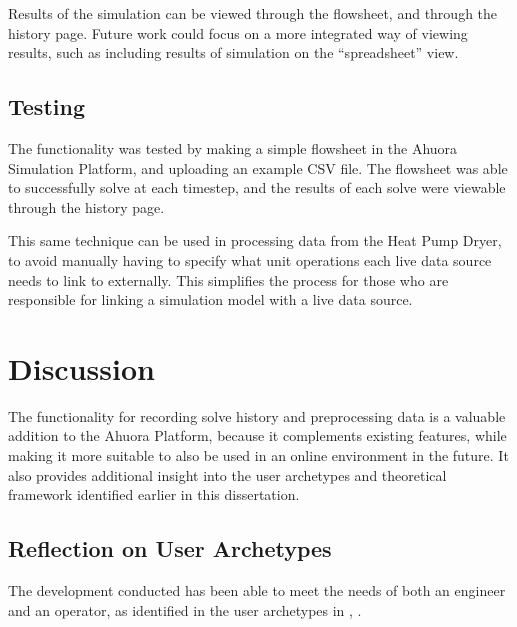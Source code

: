 Results of the simulation can be viewed through the flowsheet, and through the history page. Future work could focus on a more integrated way of viewing results, such as including results of simulation on the ``spreadsheet'' view.

\subsection{Testing}

The functionality was tested by making a simple flowsheet in the Ahuora Simulation Platform, and uploading an example CSV file. The flowsheet was able to successfully solve at each timestep, and the results of each solve were viewable through the history page. 

This same technique can be used in processing data from the Heat Pump Dryer, to avoid manually having to specify what unit operations each live data source needs to link to externally. This simplifies the process for those who are responsible for linking a simulation model with a live data source.



\section{Discussion}

The functionality for recording solve history and preprocessing data is a valuable addition to the Ahuora Platform, because it complements existing features, while making it more suitable to also be used in an online environment in the future. It also provides additional insight into the user archetypes and theoretical framework identified earlier in this dissertation.

\subsection{Reflection on User Archetypes}

The development conducted has been able to meet the needs of both an engineer and an operator, as identified in the user archetypes in , . 

